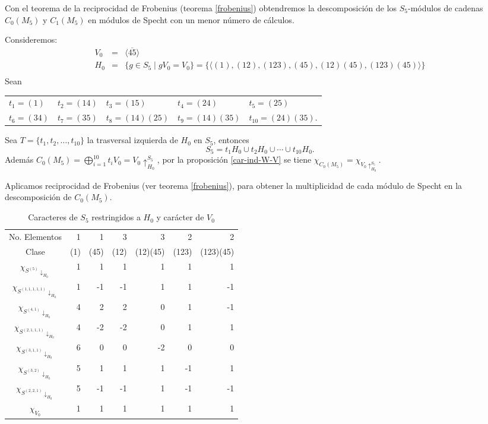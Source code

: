 \documentclass[12pt]{book}
\theoremstyle{definition}
\newcounter{in}
\begin{document}
Con el teorema de la reciprocidad de Frobenius (teorema
\ref{frobenius}) obtendremos la descomposición de los $S_{5}$-módulos de
cadenas $C_{0}(M_{5})$ y $C_{1}(M_{5})$ en módulos de Specht con un
menor número de cálculos. 

Consideremos:
\begin{eqnarray*}
  V_{0}&=&\langle\overline{45}\rangle\\
  H_{0}&=&\{g\in S_{5}\mid gV_{0}=V_{0}\}=\{\langle(1),(12),(123),(45),(12)(45),(123)(45)\rangle\}\\
\end{eqnarray*}
Sean
\begin{table}[!hbtp]
  \centering
  \begin{tabular}{lllll}
    $t_{1}=(1)$ & $t_{2}=(14)$ & $t_{3}=(15)$ & $t_{4}=(24)$ & $t_{5}=(25)$ \\
    $t_{6}=(34)$ & $t_{7}=(35)$ & $t_{8}=(14)(25)$ & $t_{9}=(14)(35)$ & $t_{10}=(24)(35)$.
  \end{tabular}
\end{table}

Sea
$T=\{t_{1},t_{2},\dots,t_{10}\}$ la trasversal izquierda de $H_{0}$ en $S_{5}$, entonces 
\begin{equation*}
S_{5}=t_{1}H_{0}\cup t_{2}H_{0}\cup\cdots\cup t_{10}H_{0}.
\end{equation*}
Además
$C_{0}(M_{5})=\bigoplus^{10}_{i=1}t_{i}V_{0}=V_{0}\uparrow^{S_{5}}_{H_0}$,
por la proposición \ref{car-ind-W-V} se tiene
$\chi_{C_{0}(M_{5})}=\chi_{V_{0}\uparrow^{S_{5}}_{H_0}}$.

Aplicamos reciprocidad de Frobenius (ver teorema \ref{frobenius}),
para obtener la multiplicidad de cada módulo de Specht en la
descomposición de $C_{0}(M_{5})$.

\begin{table}[!hbtp]
  \centering
    \begin{tabular}{c |r r r r r r}
      No. Elementos& 1 & 1 & 3 & 3 & 2 & 2 \\
      Clase & (1) & (45) & (12) & (12)(45) & (123) & (123)(45) \\
      \hline
      $\chi_{S^{(5)}\downarrow_{H_{0}}}$       & 1 & 1 & 1 & 1 & 1 & 1 \\
      $\chi_{S^{(1,1,1,1,1)}\downarrow_{H_{0}}}$ & 1 & -1 & -1 & 1 & 1 & -1 \\
      $\chi_{S^{(4,1)}\downarrow_{H_{0}}}$      & 4 & 2 & 2 & 0 & 1 & -1 \\
      $\chi_{S^{(2,1,1,1)}\downarrow_{H_{0}}}$   & 4 & -2 & -2 & 0 & 1 & 1 \\
      $\chi_{S^{(3,1,1)}\downarrow_{H_{0}}}$     & 6 & 0 & 0 & -2 & 0 & 0 \\
      $\chi_{S^{(3,2)}\downarrow_{H_{0}}}$      & 5 & 1 & 1 & 1 & -1 & 1 \\
      $\chi_{S^{(2,2,1)}\downarrow_{H_{0}}}$    & 5 & -1 & -1 & 1 & -1 & -1 \\
      \hline
      $\chi_{V_{0}}$ & 1 & 1 & 1 & 1 & 1 & 1 \\
    \end{tabular}

\caption{Caracteres de $S_{5}$ restringidos a $H_{0}$ y carácter de $V_{0}$}
\label{tab:restriccion-H_0}
\end{table}
\end{document}
